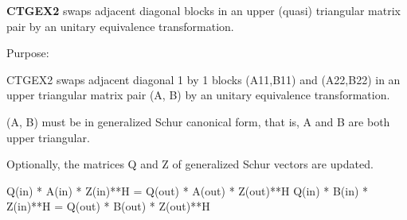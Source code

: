 {\bfseries C\+T\+G\+E\+X2} swaps adjacent diagonal blocks in an upper (quasi) triangular matrix pair by an unitary equivalence transformation. 

 \begin{DoxyParagraph}{Purpose\+: }
\begin{DoxyVerb} CTGEX2 swaps adjacent diagonal 1 by 1 blocks (A11,B11) and (A22,B22)
 in an upper triangular matrix pair (A, B) by an unitary equivalence
 transformation.

 (A, B) must be in generalized Schur canonical form, that is, A and
 B are both upper triangular.

 Optionally, the matrices Q and Z of generalized Schur vectors are
 updated.

        Q(in) * A(in) * Z(in)**H = Q(out) * A(out) * Z(out)**H
        Q(in) * B(in) * Z(in)**H = Q(out) * B(out) * Z(out)**H\end{DoxyVerb}
 
\end{DoxyParagraph}

